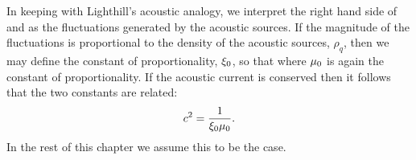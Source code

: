 In keeping with Lighthill's acoustic analogy, we  interpret the right hand side of  and   
as the fluctuations generated by the acoustic sources.
If the magnitude of the  fluctuations is proportional to the density of the acoustic sources, $\rho_q$,
then we may define the constant of proportionality, $\xi_0$, so that
where $\mu_0$ is again  the constant of proportionality.
If the acoustic current is conserved %
then it follows that the two constants are related: 
\begin{align}
  c^2 = \frac{1}{\xi_0\mu_0}.
\end{align}
In the rest of this chapter we assume this to be the case.










